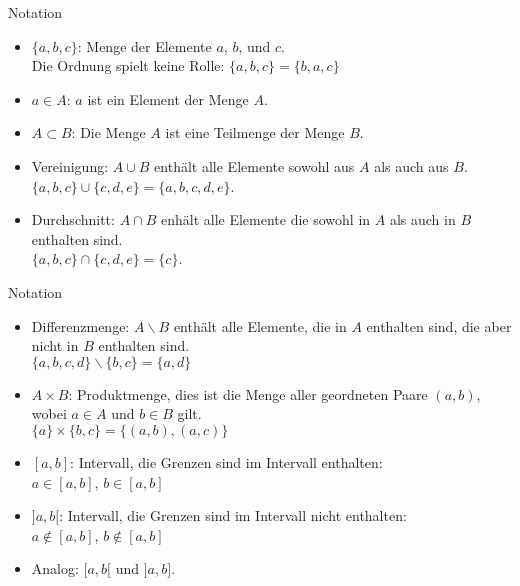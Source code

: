 \documentclass[german]{beamer}
\begin{document}
\begin{frame}{Notation}

\begin{itemize}

\item 
\alert{$\{a,b,c\}$}: Menge der Elemente $a$, $b$, und $c$.
\\
Die Ordnung spielt keine Rolle: $\{a,b,c\} = \{b,a,c\}$
\pause

\item
\alert{$a\in A$}: $a$ ist ein Element der Menge $A$.
\pause

\item
\alert{$A \subset B$}: Die Menge $A$ ist eine Teilmenge der Menge $B$.
\pause

\item Vereinigung: \alert{$A \cup B$} enth\"alt alle Elemente sowohl aus $A$ als auch aus $B$.
\\
$\{a,b,c\} \cup \{c,d,e\} = \{a,b,c,d,e\}$.
\pause

\item
Durchschnitt: \alert{$A \cap B$} enh\"alt alle Elemente die sowohl in $A$ als auch in $B$ enthalten sind.
\\
$\{a,b,c\} \cap \{c,d,e\} = \{c\}$.

\end{itemize}

\end{frame}

\begin{frame}{Notation}

\begin{itemize}

\item
Differenzmenge: \alert{$A \backslash B$} enth\"alt alle Elemente, die in $A$ enthalten sind, die aber nicht in $B$ enthalten sind.
\\
$\{a,b,c,d\} \backslash \{b,c\} = \{a,d\}$
\pause

\item
\alert{$A \times B$}: Produktmenge, dies ist die Menge aller geordneten Paare $(a,b)$, wobei $a \in A$ und $b \in B$ gilt.
\\
$\{a\} \times \{b,c\} = \{ (a,b), (a,c) \}$
\pause

\item
\alert{$[a,b]$}: Intervall, die Grenzen sind im Intervall enthalten: \\
$a\in[a,b]$, $b\in[a,b]$ 
\pause

\item
\alert{$]a,b[$}: Intervall, die Grenzen sind im Intervall nicht enthalten: \\
$a\notin[a,b]$, $b\notin[a,b]$ 
\pause

\item
Analog: \alert{$[a,b[$} und \alert{$]a,b]$}.

\end{itemize}

\end{frame}
\end{document}
